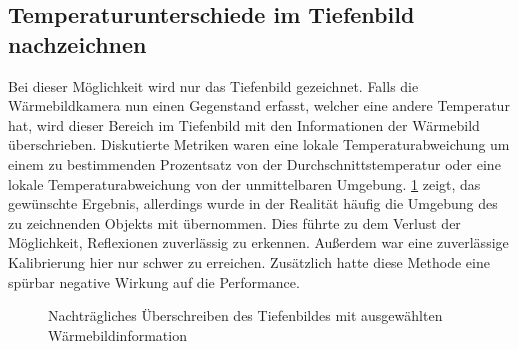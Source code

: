 \subsection{Temperaturunterschiede im Tiefenbild nachzeichnen}
\label{sec:fusion_post-render}
Bei dieser Möglichkeit wird nur das Tiefenbild gezeichnet.
Falls die Wärmebildkamera nun einen Gegenstand erfasst, welcher eine andere Temperatur hat, wird dieser Bereich im Tiefenbild mit den Informationen der Wärmebild überschrieben.
Diskutierte Metriken waren eine lokale Temperaturabweichung um einem zu bestimmenden Prozentsatz von der Durchschnittstemperatur oder eine lokale Temperaturabweichung von der unmittelbaren Umgebung.
\cref{fig:fusion_post-render} zeigt, das gewünschte Ergebnis, allerdings wurde in der Realität häufig die Umgebung des zu zeichnenden Objekts mit übernommen.
Dies führte zu dem Verlust der Möglichkeit, Reflexionen zuverlässig zu erkennen.
Außerdem war eine zuverlässige Kalibrierung hier nur schwer zu erreichen.
Zusätzlich hatte diese Methode eine spürbar negative Wirkung auf die Performance.
\begin{figure}[H]
	\centering
	\caption{Nachträgliches Überschreiben des Tiefenbildes mit ausgewählten Wärmebildinformation}
	\label{fig:fusion_post-render}
\end{figure}

